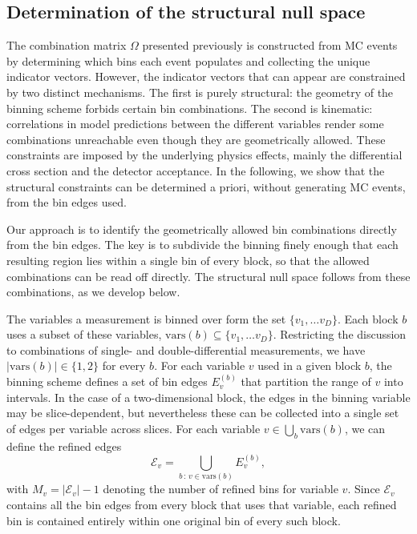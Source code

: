 \documentclass[a4paper,11pt]{article}
\begin{document}
\subsection{Determination of the structural null space}
\label{subsec:null_space}

The combination matrix $\Omega$ presented previously is constructed from MC events by determining which bins each event populates and collecting the unique indicator vectors. However, the indicator vectors that can appear are constrained by two distinct mechanisms. The first is purely structural: the geometry of the binning scheme forbids certain bin combinations. The second is kinematic: correlations in model predictions between the different variables render some combinations unreachable even though they are geometrically allowed. These constraints are imposed by the underlying physics effects, mainly the differential cross section and the detector acceptance. In the following, we show that the structural constraints can be determined a priori, without generating MC events, from the bin edges used.

Our approach is to identify the geometrically allowed bin combinations directly from the bin edges. The key is to subdivide the binning finely enough that each resulting region lies within a single bin of every block, so that the allowed combinations can be read off directly. The structural null space follows from these combinations, as we develop below.

The variables a measurement is binned over form the set $\{v_{1}, \ldots v_{D}\}$. Each block $b$ uses a subset of these variables, $\mathrm{vars}(b) \subseteq \{v_{1}, \ldots v_{D}\}$. Restricting the discussion to combinations of single- and double-differential measurements, we have $|\mathrm{vars}(b)| \in \{1,2\}$ for every $b$. For each variable $v$ used in a given block $b$, the binning scheme defines a set of bin edges $E_{v}^{(b)}$ that partition the range of $v$ into intervals. In the case of a two-dimensional block, the edges in the binning variable may be slice-dependent, but nevertheless these can be collected into a single set of edges per variable across slices. For each variable $v \in \bigcup_{b} \mathrm{vars}(b)$, we can define the refined edges
\begin{equation}
    \mathcal{E}_{v} = \bigcup_{b \, : \, v \in \mathrm{vars}(b)} E_{v}^{(b)},
\end{equation}
with $M_{v} = |\mathcal{E}_{v}| - 1$ denoting the number of refined bins for variable $v$. Since $\mathcal{E}_{v}$ contains all the bin edges from every block that uses that variable, each refined bin is contained entirely within one original bin of every such block.
\end{document}
